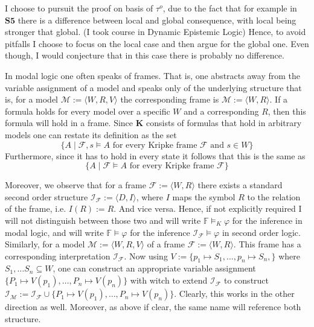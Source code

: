 \documentclass[11pt,a4paper]{article}
\begin{document}
I choose to pursuit the proof on basis of $\tau^o$, due to the fact that for example in $\mathbf{S5}$ there is a difference between local and global consequence, with local being stronger that global. (I took course in Dynamic Epistemic Logic)
Hence, to avoid pitfalls I choose to focus on the local case and then argue for the global one. Even though, I would conjecture that in this case there is probably no difference. 


In modal logic one often speaks of frames. That is, one abstracts away from the variable assignment of a model and speaks only of the underlying structure that is, for a model $\mathcal{M}:=\langle W, R , V\rangle$ the corresponding frame is $\mathcal{M}:=\langle W, R \rangle$. If a formula holds for every model over a specific $W$ and a corresponding $R$, then this formula will hold in a frame. Since $\mathbf{K}$ consists of formulas that hold in arbitrary models one can restate its definition as the set
\begin{equation*}
\{ A \mid \mathcal{F}, s \models A \text{ for every Kripke frame } \mathcal{F} \text{ and } s \in W \}
\end{equation*}
Furthermore, since it has to hold in every state it follows that this is the same as
\begin{equation*}
\{ A \mid \mathcal{F}\models A \text{ for every Kripke frame } \mathcal{F} \}
\end{equation*}

Moreover, we observe that for a frame $\mathcal{F}:=\langle W, R\rangle$ there exists a standard second order structure $\mathcal{I}_{\mathcal{F}}:=\langle D, I\rangle$, where $I$ maps the symbol $R$ to the relation of the frame, i.e. $I(R):=R$. And vice versa. 
Hence, if not explicitly required I will not distinguish between those two and will write $\mathbb{F} \models_{K} \varphi$ for the inference in modal logic, and will write $\mathbb{F} \models \varphi$ for the inference $\mathcal{I}_{\mathcal{F}} \models \varphi$ in second order logic. \\
Similarly, for a model $\mathcal{M}:=\langle W, R, V\rangle$ of a frame $\mathcal{F}:=\langle W, R\rangle$. This frame has a corresponding interpretation $\mathcal{I}_{\mathcal{F}}$. Now using $V:= \{p_1 \mapsto S_1, \dots, p_n \mapsto S_n,\}$ where $S_1, \dots S_n \subseteq W$, one can construct an appropriate variable assignment $\{P_1 \mapsto V(p_1), \dots, P_n \mapsto V(p_n)\}$ with witch to extend $\mathcal{I}_{\mathcal{F}}$ to construct $\mathcal{I}_{\mathcal{M}} := \mathcal{I}_{\mathcal{F}} \cup \{P_1 \mapsto V(p_1), \dots, P_n \mapsto V(p_n)\}$. Clearly, this works in the other direction as well. Moreover, as above if clear, the same name will reference both structure.
\end{document}
